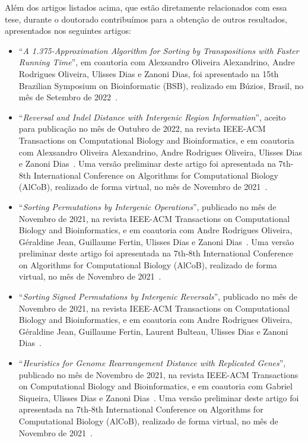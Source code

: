 Além dos artigos listados acima, que estão diretamente relacionados com essa tese, durante o doutorado contribuímos para a obtenção de  outros resultados, apresentados nos seguintes artigos:

\begin{itemize}
  \item ``\textit{A 1.375-Approximation Algorithm for Sorting by Transpositions with Faster Running Time}'', em coautoria com Alexsandro Oliveira Alexandrino, Andre Rodrigues Oliveira, Ulisses Dias e Zanoni Dias, foi apresentado na 15th Brazilian Symposium on Bioinformatic (BSB), realizado em Búzios, Brasil, no mês de Setembro de 2022~\cite{2022bsb-alexandrino-etal}.

  \item ``\textit{Reversal and Indel Distance with Intergenic Region Information}'', aceito para publicação no mês de Outubro de 2022, na revista IEEE-ACM Transactions on Computational Biology and Bioinformatics, e em coautoria com Alexsandro Oliveira Alexandrino, Andre Rodrigues Oliveira, Ulisses Dias e Zanoni Dias~\cite{2022b-alexandrino-etal}. Uma versão preliminar deste artigo foi apresentada na 7th-8th International Conference on Algorithms for Computational Biology (AlCoB), realizado de forma virtual, no mês de Novembro de 2021~\cite{2021b-alexandrino-etal}.

  \item ``\textit{Sorting Permutations by Intergenic Operations}'', publicado no mês de Novembro de 2021, na revista IEEE-ACM Transactions on Computational Biology and Bioinformatics, e em coautoria com Andre Rodrigues Oliveira, Géraldine Jean, Guillaume Fertin, Ulisses Dias e Zanoni Dias~\cite{2021a-oliveira-etal}. Uma versão preliminar deste artigo foi apresentada na 7th-8th International Conference on Algorithms for Computational Biology (AlCoB), realizado de forma virtual, no mês de Novembro de 2021~\cite{2020-oliveira-etal}.

  \item ``\textit{Sorting Signed Permutations by Intergenic Reversals}'', publicado no mês de Novembro de 2021, na revista IEEE-ACM Transactions on Computational Biology and Bioinformatics, e em coautoria com Andre Rodrigues Oliveira, Géraldine Jean, Guillaume Fertin, Laurent Bulteau, Ulisses Dias e Zanoni Dias~\cite{2021b-oliveira-etal}.

  \item ``\textit{Heuristics for Genome Rearrangement Distance with Replicated Genes}'', publicado no mês de Novembro de 2021, na revista IEEE-ACM Transactions on Computational Biology and Bioinformatics, e em coautoria com Gabriel Siqueira, Ulisses Dias e Zanoni Dias~\cite{2021a-siqueira-etal}. Uma versão preliminar deste artigo foi apresentada na 7th-8th International Conference on Algorithms for Computational Biology (AlCoB), realizado de forma virtual, no mês de Novembro de 2021~\cite{2020-siqueira-etal}.


\end{itemize}
